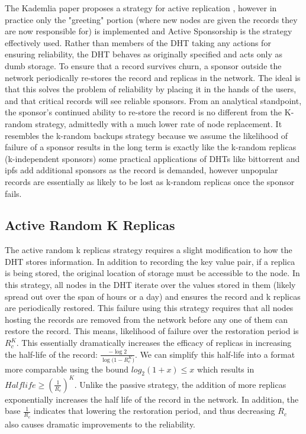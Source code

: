\documentclass[conference]{IEEEtran}
\begin{document}
The Kademlia paper proposes a strategy for active replication \cite{kademlia}, however in practice only the "greeting" portion (where new nodes are given the records they are now responsible for) is implemented and Active Sponsorship is the strategy effectively used.
Rather than members of the DHT taking any actions for ensuring reliability, the DHT behaves as originally specified and acts only as dumb storage.
To ensure that a record survives churn, a sponsor outside the network periodically re-stores the record and replicas in the network.
The ideal is that this solves the problem of reliability by placing it in the hands of the users, and that critical records will see reliable sponsors.
From an analytical standpoint, the sponsor's continued ability to re-store the record is no different from the K-random strategy, admittedly with a much lower rate of node replacement.
It resembles the k-random backups strategy because we assume the likelihood of failure of a sponsor results in the long term is exactly like the k-random replicas (k-independent sponsors) some practical applications of DHTs like bittorrent and ipfs add additional sponsors as the record is demanded, however unpopular records are essentially as likely to be lost as k-random replicas once the sponsor fails.



\subsection{Active Random K Replicas}
The active random k replicas strategy requires a slight modification to how the DHT stores information.
In addition to recording the key value pair, if a replica is being stored, the original location of storage must be accessible to the node.
In this strategy, all nodes in the DHT iterate over the values stored in them (likely spread out over the span of hours or a day) and ensures the record and k replicas are periodically restored.
This failure using this strategy requires that all nodes hosting the records are removed from the network before any one of them can restore the record.
This means, likelihood of failure over the restoration period is $R_{c}^{K}$. This essentially dramatically increases the efficacy of replicas in increasing the half-life of the record: $\frac{-\log{2} }{\log{(1-R_{c}^{K}})}$.
We can simplify this half-life into a format more comparable using the bound $log_{2}(1+x) \leq x$ which results in $Halflife \geq (\frac{1}{R_{c}})^{K}$.
Unlike the passive strategy, the addition of more replicas exponentially increases the half life of the record in the network.
In addition, the base $\frac{1}{R_{c}}$ indicates that lowering the restoration period, and thus decreasing $R_{c}$ also causes dramatic improvements to the reliability.
\end{document}
